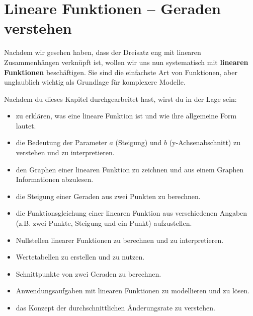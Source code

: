 \section{Lineare Funktionen – Geraden verstehen}

Nachdem wir gesehen haben, dass der Dreisatz eng mit linearen Zusammenhängen verknüpft ist, wollen wir uns nun systematisch mit \textbf{linearen Funktionen} beschäftigen. Sie sind die einfachste Art von Funktionen, aber unglaublich wichtig als Grundlage für komplexere Modelle.


\begin{tcolorbox}[colback=blue!5!white, colframe=blue!75!black, title=Was du in diesem Kapitel lernen wirst:]
Nachdem du dieses Kapitel durchgearbeitet hast, wirst du in der Lage sein:
\begin{itemize}[noitemsep, topsep=0pt]
    \item zu erklären, was eine lineare Funktion ist und wie ihre allgemeine Form lautet.
    \item die Bedeutung der Parameter $a$ (Steigung) und $b$ (y-Achsenabschnitt) zu verstehen und zu interpretieren.
    \item den Graphen einer linearen Funktion zu zeichnen und aus einem Graphen Informationen abzulesen.
    \item die Steigung einer Geraden aus zwei Punkten zu berechnen.
    \item die Funktionsgleichung einer linearen Funktion aus verschiedenen Angaben (z.B. zwei Punkte, Steigung und ein Punkt) aufzustellen.
    \item Nullstellen linearer Funktionen zu berechnen und zu interpretieren.
    \item Wertetabellen zu erstellen und zu nutzen.
    \item Schnittpunkte von zwei Geraden zu berechnen.
    \item Anwendungsaufgaben mit linearen Funktionen zu modellieren und zu lösen.
    \item das Konzept der durchschnittlichen Änderungsrate zu verstehen.
\end{itemize}
\end{tcolorbox}
\bigskip


